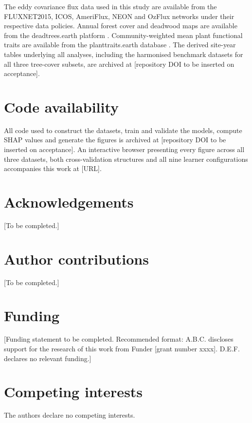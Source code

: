 \documentclass[pdflatex,sn-nature]{sn-jnl}%
\theoremstyle{thmstyleone}%
\theoremstyle{thmstyletwo}%
\theoremstyle{thmstylethree}%
\begin{document}
The eddy covariance flux data used in this study are available from the FLUXNET2015, ICOS, AmeriFlux, NEON and OzFlux networks under their respective data policies. Annual forest cover and deadwood maps are available from the deadtrees.earth platform \cite{mosig2026deadtrees}. Community-weighted mean plant functional traits are available from the planttraits.earth database \cite{lusk2026crowdsourced}. The derived site-year tables underlying all analyses, including the harmonised benchmark datasets for all three tree-cover subsets, are archived at [repository DOI to be inserted on acceptance].

\section*{Code availability}

All code used to construct the datasets, train and validate the models, compute SHAP values and generate the figures is archived at [repository DOI to be inserted on acceptance]. An interactive browser presenting every figure across all three datasets, both cross-validation structures and all nine learner configurations accompanies this work at [URL].

\section*{Acknowledgements}

[To be completed.]

\section*{Author contributions}

[To be completed.]

\section*{Funding}

[Funding statement to be completed. Recommended format: A.B.C. discloses support for the research of this work from Funder [grant number xxxx]. D.E.F. declares no relevant funding.]

\section*{Competing interests}

The authors declare no competing interests.
\end{document}
